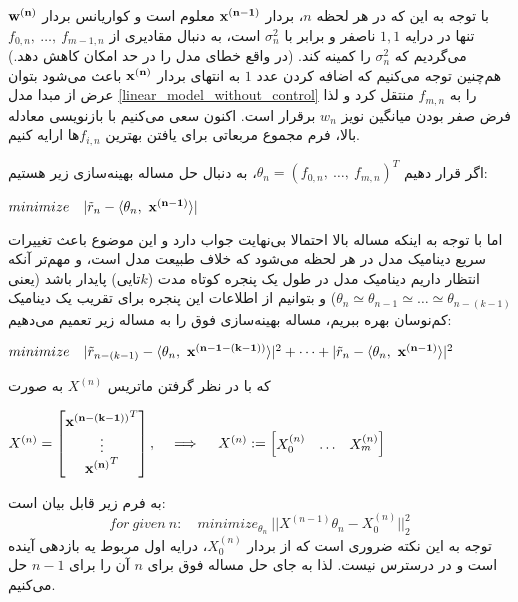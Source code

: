 \documentclass{scribe-cgenomics}
\begin{document}
با توجه به این که در هر لحظه
$n$، 
بردار
$\bold{x^{(n-1)}}$
معلوم است و کواریانس بردار
$\bold{w^{(n)}}$
تنها در درایه
$1,1$
ناصفر و برابر با
$\sigma_n^2$
است، به دنبال مقادیری از
$f_{0, n},\ \dots,\ f_{m-1, n}$
می‌گردیم که
$\sigma_n^2$
را کمینه کند. (در واقع خطای مدل را در حد امکان کاهش دهد.) هم‌چنین توجه می‌کنیم که اضافه کردن عدد
$1$
به انتهای بردار
$\bold{x^{(n)}}$
باعث می‌شود بتوان عرض از مبدا مدل
\ref{linear_model_without_control}
را به
$f_{m,n}$
منتقل کرد و لذا فرض صفر بودن میانگین نویز
$w_n$
برقرار است. اکنون سعی می‌کنیم با بازنویسی معادله بالا، فرم مجموع مربعاتی برای یافتن بهترین
$f_{i,n}$ها
ارایه کنیم.

اگر قرار دهیم
$\theta_n = (f_{0,n},\ \dots,\ f_{m, n})^T$،
به دنبال حل مساله بهینه‌سازی زیر هستیم:
\begin{center}
$minimize\quad |\tilde{r}_n - \langle\theta_n,\ \bold{x^{(n-1)}}\rangle |$
\end{center}
اما با توجه به اینکه مساله بالا احتمالا بی‌نهایت جواب دارد و این موضوع باعث تغییرات سریع دینامیک مدل در هر لحظه می‌شود که خلاف طبیعت مدل است، و مهم‌تر آنکه انتظار داریم دینامیک مدل در طول یک پنجره کوتاه مدت
($k$تایی)
پایدار باشد (یعنی
$\theta_{n}\simeq \theta_{n-1} \simeq \dots \simeq \theta_{n-(k-1)}$) و بتوانیم از اطلاعات این پنجره برای تقریب یک دینامیک کم‌نوسان بهره ببریم، مساله بهینه‌سازی فوق را به مساله زیر تعمیم می‌دهیم:
\begin{center}
$minimize \quad |\tilde{r}_{n-(k-1)} - \langle\theta_{n},\ \bold{x^{(n-1-(k-1))}}\rangle |^2 + \dots + |\tilde{r}_n - \langle\theta_n,\ \bold{x^{(n-1)}}\rangle |^2$
\end{center}
که با در نظر گرفتن ماتریس
$X^{(n)}$
به صورت
\begin{center}
$
X^{(n)} = 
\begin{bmatrix}
\bold{x^{(n-(k-1))}}^T \\
\vdots \\
\bold{x^{(n)}}^T \\
\end{bmatrix},
\quad
\implies
\quad
X^{(n)} :=
\begin{bmatrix}
X^{(n)}_0 & \dots & X^{(n)}_m
\end{bmatrix}
$
\end{center}
به فرم زیر قابل بیان است:
\begin{equation}\label{linear_model_without_control_optimization}
for\ given\ n:\quad minimize_{\theta_n}\ ||X^{(n-1)}\theta_n - X^{(n)}_0||_2^2
\end{equation}
توجه به این نکته ضروری است که از بردار
$X^{(n)}_0$،
درایه اول مربوط یه بازدهی آینده است و در درسترس نیست. لذا به جای حل مساله فوق برای
$n$
آن را برای
$n-1$
حل می‌کنیم.
\end{document}
